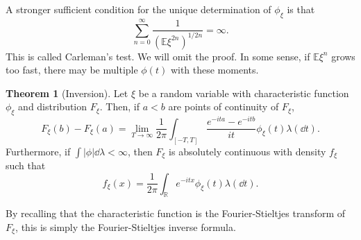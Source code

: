 \documentclass[]{article}
\theoremstyle{definition}
\newtheorem{theorem}{Theorem}
\theoremstyle{definition}
\begin{document}
A stronger sufficient condition for the unique determination of \(\phi_\xi\) is 
that 
\[\sum_{n = 0}^\infty \frac{1}{(\mathbb{E} \xi^{2n})^{1 / 2n}} = \infty.\]
This is called Carleman's test. We will omit the proof. In some sense, 
if \(\mathbb{E}\xi^n\) grows too fast, there may be multiple \(\phi(t)\) with 
these moments. 

\begin{theorem}[Inversion]
  Let \(\xi\) be a random variable with characteristic function \(\phi_\xi\) and 
  distribution \(F_\xi\). Then, if \(a < b\) are points of continuity of \(F_\xi\), 
  \[F_\xi(b) - F_\xi(a) = \lim_{T \to \infty}\frac{1}{2\pi} 
  \int_{[-T, T]} \frac{e^{-ita} - e^{-itb}}{it} \phi_\xi(t) \lambda(\dd t).\]
  Furthermore, if \(\int |\phi| \dd \lambda < \infty\), then \(F_\xi\) is absolutely 
  continuous with density \(f_\xi\) such that 
  \[f_\xi(x) = \frac{1}{2\pi} \int_{\mathbb{R}} e^{-itx} \phi_\xi(t) \lambda(\dd t).\]
\end{theorem}

By recalling that the characteristic function is the Fourier-Stieltjes transform 
of \(F_\xi\), this is simply the Fourier-Stieltjes inverse formula.
\end{document}
